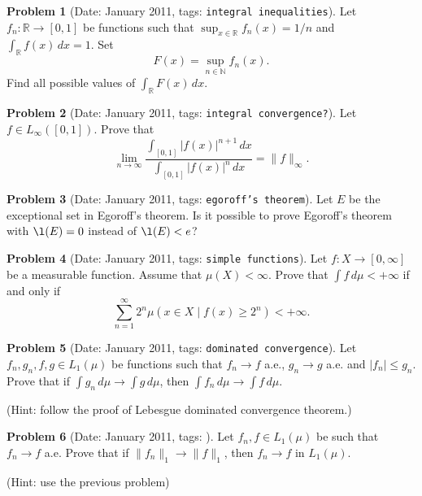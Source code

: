\documentclass[11pt, notitlepage]{article}
\theoremstyle{definition}
\theoremstyle{definition}
\theoremstyle{definition}
\newtheorem{probstate}{Problem}
\theoremstyle{remark}
\newenvironment{problem}[2]{
    \begin{probstate}[Date: #1, tags: \texttt{#2}]
}
{
  \end{probstate}
}
\begin{document}
\begin{problem}{January 2011}{integral inequalities}
  Let $f_n: \mathbb{R} \to [0, 1]$ be functions such that
 $\sup_{x \in \mathbb{R}} f_n(x)=1/n$ and $\int_{\mathbb{R}} f(x) \, dx=1$. Set
 \[
  F(x)= \sup_{n \in \mathbb{N}} f_n(x).
 \]
 Find all possible values of $\int_{\mathbb{R}} F(x) \, dx$.

\end{problem}

\begin{problem}{January 2011}{integral convergence?}
  Let $f \in L_{\infty}([0,1])$. Prove that
 \[
   \lim_{n \to \infty} \frac{\int_{[0,1]} |f(x)|^{n+1} \, dx}{\int_{[0,1]} |f(x)|^{n} \, dx} = \|f\|_{\infty}.
 \]

\end{problem}

\begin{problem}{January 2011}{egoroff's theorem}
  Let $E$ be the exceptional set in Egoroff's theorem.
    Is it possible to prove Egoroff's theorem with
    $\l(E)=0$ instead of $\l(E) < e$?
\end{problem}

\begin{problem}{January 2011}{simple functions}
  Let $f:X \to [0, \infty]$ be a measurable
 function. Assume that $\mu (X) < \infty$.
 Prove that $\int f \, d \mu< +\infty$ if and only if
 \[
 \sum_{n=1}^{\infty} 2^n \mu (x \in X \mid f(x) \ge 2^n) < +\infty.
 \]
\end{problem}

\begin{problem}{January 2011}{dominated convergence}
  Let $f_n,g_n,f,g \in L_1(\mu)$ be functions such that
    $f_n \to f$ a.e., $g_n \to g$ a.e. and $|f_n| \le g_n$. Prove
    that if $\int g_n \, d \mu \to \int g \, d \mu$, then
    $\int f_n \, d \mu \to \int f \, d \mu$.

    (Hint: follow the proof of Lebesgue dominated convergence
    theorem.)
\end{problem}

\begin{problem}{January 2011}{}
  Let $f_n,f \in L_1(\mu)$ be such that $f_n \to f$ a.e.
    Prove that if \newline
    $\|f_n\|_1 \to \|f\|_1$,
    then $f_n \to f$ in $L_1(\mu)$.

    (Hint: use the previous problem)

\end{problem}
\end{document}
